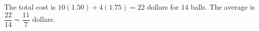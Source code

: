 The total cost is $10(1.50)+4(1.75)=22$ dollars for $14$ balls. The average is $\dfrac{22}{14}=\boxed{\dfrac{11}{7}}$ dollars.
